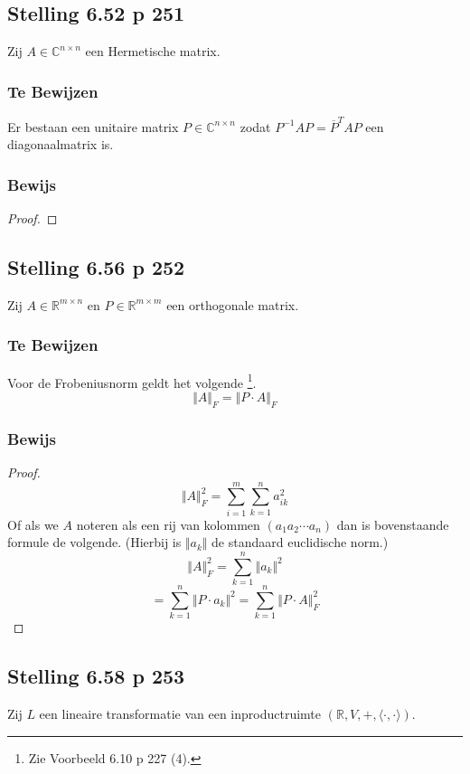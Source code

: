 \documentclass[lineaire_algebra_oplossingen.tex]{subfiles}
\begin{document}
\subsection{Stelling 6.52 p 251}
Zij $A \in \mathbb{C}^{n\times n}$ een Hermetische matrix.
\subsubsection*{Te Bewijzen}
Er bestaan een unitaire matrix $P \in \mathbb{C}^{n\times n}$ zodat $P^{-1}AP = \overline{P}^TAP$ een diagonaalmatrix is.
\subsubsection*{Bewijs}
\begin{proof}

\end{proof}

\subsection{Stelling 6.56 p 252}
Zij $A \in \mathbb{R}^{m\times n}$ en $P \in \mathbb{R}^{m\times m}$ een orthogonale matrix.

\subsubsection*{Te Bewijzen}
Voor de Frobeniusnorm geldt het volgende \footnote{Zie Voorbeeld 6.10 p 227 (4).}.
\[
\Vert A\Vert_F = \Vert P\cdot A\Vert_F
\]

\subsubsection*{Bewijs}
\begin{proof}
\[
\Vert A\Vert_F^2 = \sum_{i=1}^m\sum_{k=1}^na_{ik}^2
\]
Of als we $A$ noteren als een rij van kolommen $(a_1 a_2 \cdots a_n)$ dan is bovenstaande formule de volgende. (Hierbij is $\Vert a_{k}\Vert$ de standaard euclidische norm.)
\[
\Vert A\Vert_F^2 = \sum_{k=1}^n\Vert a_{k}\Vert^2
\]
\[
 = \sum_{k=1}^n\Vert P\cdot a_{k}\Vert^2
  = \sum_{k=1}^n\Vert P\cdot A\Vert^2_F
\]
\end{proof}

\subsection{Stelling 6.58 p 253}
Zij $L$ een lineaire transformatie van een inproductruimte $(\mathbb{R},V,+,\langle \cdot,\cdot \rangle)$.
\end{document}
